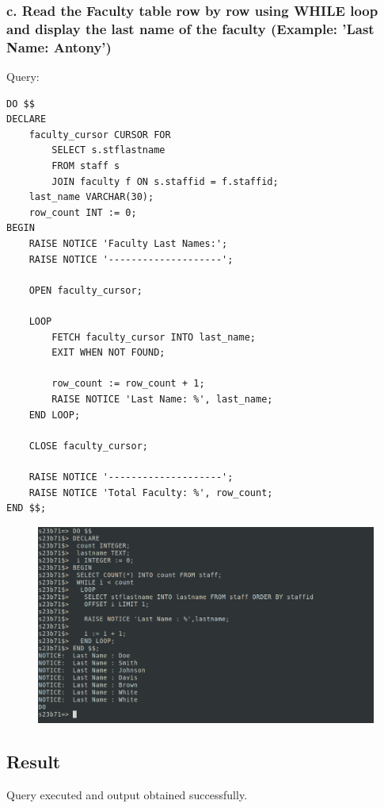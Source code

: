 \documentclass{article}
\begin{document}
\subsubsection*{c. Read the Faculty table row by row using WHILE loop and display the last name of the faculty (Example: 'Last Name: Antony')}
Query:
\begin{Verbatim}[frame=single,framerule=1pt,fontfamily=courier,fontsize=\small]
DO $$
DECLARE
    faculty_cursor CURSOR FOR 
        SELECT s.stflastname 
        FROM staff s 
        JOIN faculty f ON s.staffid = f.staffid;
    last_name VARCHAR(30);
    row_count INT := 0;
BEGIN
    RAISE NOTICE 'Faculty Last Names:';
    RAISE NOTICE '--------------------';
    
    OPEN faculty_cursor;
    
    LOOP
        FETCH faculty_cursor INTO last_name;
        EXIT WHEN NOT FOUND;
        
        row_count := row_count + 1;
        RAISE NOTICE 'Last Name: %', last_name;
    END LOOP;
    
    CLOSE faculty_cursor;
    
    RAISE NOTICE '--------------------';
    RAISE NOTICE 'Total Faculty: %', row_count;
END $$;
\end{Verbatim}
\begin{figure}[H]
    \centering
    \includegraphics[width=\textwidth]{cycle5/5_3_c.png}
\end{figure}

\subsection*{Result}
Query executed and output obtained successfully.

\newpage
\section*{}
\end{document}
